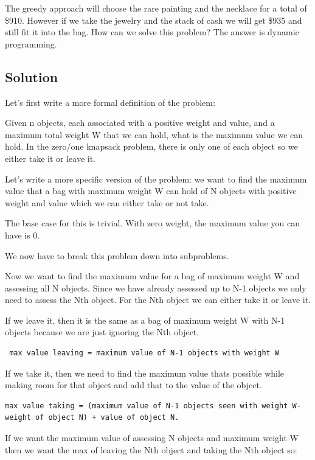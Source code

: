 \documentclass[11pt,oneside]{book}
\begin{document}
The greedy approach will choose the rare painting and the necklace for a total of \$910. However if we take the jewelry and the stack of cash we will get \$935 and still fit it into the bag. How can we solve this problem? The answer is dynamic programming.

\subsection{Solution}

Let's first write a more formal definition of the problem:

Given n objects, each associated with a positive weight and value, and a maximum total weight W that we can hold, what is the maximum value we can hold. In the zero/one knapsack problem, there is only one of each object so we either take it or leave it.

Let's write a more specific version of the problem: we want to find the maximum value that a bag with maximum weight W can hold of N objects with positive weight and value which we can either take or not take.

The base case for this is trivial. With zero weight, the maximum value you can have is 0.

We now have to break this problem down into subproblems.

Now we want to find the maximum value for a bag of maximum weight W and assessing all N objects. Since we have already assessed up to N-1 objects we only need to assess the Nth object. For the Nth object we can either take it or leave it.

If we leave it, then it is the same as a bag of maximum weight W with N-1 objects because we are just ignoring the Nth object.

\begin{lstlisting} max value leaving = maximum value of N-1 objects with weight W
\end{lstlisting}

If we take it, then we need to find the maximum value thats possible while making room for that object and add that to the value of the object.

\begin{lstlisting}max value taking = (maximum value of N-1 objects seen with weight W-weight of object N) + value of object N. 
\end{lstlisting}

If we want the maximum value of assessing N objects and maximum weight W then we want the max of leaving the Nth object and taking the Nth object so:
\end{document}
